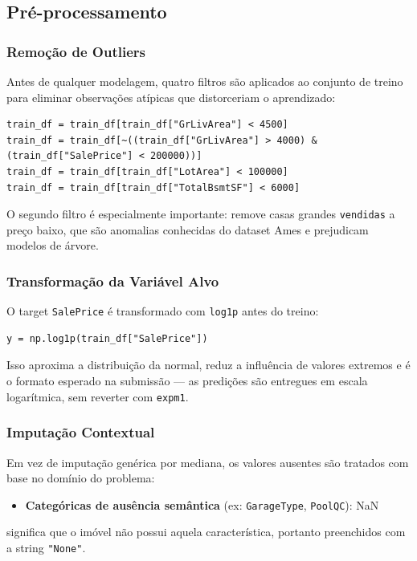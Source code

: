 \documentclass[11pt]{article}
\begin{document}
\subsection{Pré-processamento}
\label{sec:org4aef768}
\subsubsection{Remoção de Outliers}
\label{sec:org87c76cf}
Antes de qualquer modelagem, quatro filtros são aplicados ao conjunto de treino para eliminar observações atípicas que distorceriam o aprendizado:

\begin{verbatim}
train_df = train_df[train_df["GrLivArea"] < 4500]
train_df = train_df[~((train_df["GrLivArea"] > 4000) & (train_df["SalePrice"] < 200000))]
train_df = train_df[train_df["LotArea"] < 100000]
train_df = train_df[train_df["TotalBsmtSF"] < 6000]
\end{verbatim}

O segundo filtro é especialmente importante: remove casas grandes \texttt{vendidas} a preço baixo, que são anomalias conhecidas do dataset Ames e prejudicam modelos de árvore.
\subsubsection{Transformação da Variável Alvo}
\label{sec:orge9fd220}

O target \texttt{SalePrice} é transformado com \texttt{log1p} antes do treino:

\begin{verbatim}
y = np.log1p(train_df["SalePrice"])
\end{verbatim}

Isso aproxima a distribuição da normal, reduz a influência de valores extremos e é o formato esperado na submissão — as predições são entregues em escala logarítmica, sem reverter com \texttt{expm1}.
\subsubsection{Imputação Contextual}
\label{sec:org9bd6a0c}
Em vez de imputação genérica por mediana, os valores ausentes são tratados com base no domínio do problema:

\begin{itemize}
\item \textbf{Categóricas de ausência semântica} (ex: \texttt{GarageType}, \texttt{PoolQC}): NaN
\end{itemize}
significa que o imóvel não possui aquela característica, portanto preenchidos com a string \texttt{"None"}.
\end{document}

